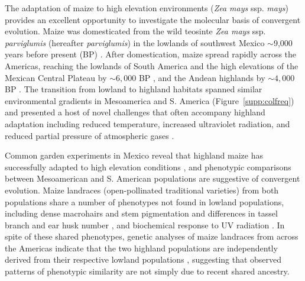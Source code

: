 The adaptation of maize to high elevation environments (\emph{Zea mays} ssp. \emph{mays}) provides an excellent opportunity to investigate the molecular basis of convergent evolution.  
Maize was domesticated from the wild teosinte \emph{Zea mays} ssp. \emph{parviglumis} (hereafter \emph{parviglumis}) in the lowlands of southwest Mexico $\sim$9,000 years before present (BP) \cite[]{Matsuoka_2002_11983901,Piperno_2009_19307570,vanHeerwaarden_2011_21189301}. 
After domestication, maize spread rapidly across the Americas, reaching the lowlands of South America and the high elevations of the Mexican Central Plateau by $\sim 6,000$ BP \cite[]{Piperno_2006_69}, and the Andean highlands by $\sim 4,000$ BP \cite[]{Perry_2006_16511492,Grobman_2012_22307642}. 
The transition from lowland to highland habitats spanned similar environmental gradients in Mesoamerica and S. America (Figure~\ref{supp:colfreq}) and presented a host of novel challenges that often accompany highland adaptation including reduced temperature, increased ultraviolet radiation, and reduced partial pressure of atmospheric gases \cite[]{Korner_2007_17988759}.

Common garden experiments in Mexico reveal that highland maize has successfully adapted to high elevation conditions \cite[]{Mercer2008}, and phenotypic comparisons between Mesoamerican and S. American populations are suggestive of convergent evolution.  
Maize landraces (open-pollinated traditional varieties) from both populations share a number of phenotypes not found in lowland populations, including dense macrohairs and stem pigmentation \cite[]{Wilkes_1977,Wellhausen1957:book} and differences in tassel branch and ear husk number \cite[]{brewbaker2014diversity}, and biochemical response to UV radiation \cite[]{Casati2005}. 
In spite of these shared phenotypes, genetic analyses of maize landraces from across the Americas indicate that the two highland populations are independently derived from their respective lowland populations \cite[]{Vigouroux_2008_21632329, vanHeerwaarden_2011_21189301}, suggesting that observed patterns of phenotypic similarity are not simply due to recent shared ancestry. 

